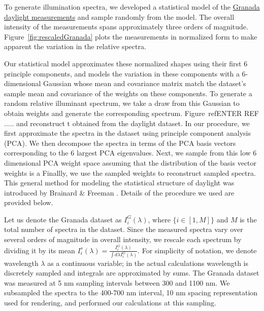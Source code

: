 \documentclass{jov}
\begin{document}
To generate illumination spectra, we developed a statistical model of the \href{http://colorimaginglab.ugr.es/pages/Data}{Granada daylight measurements} \cite{peyvandi2016colorimetric} and sample randomly from the model.
The overall intensity of the measurements spans approximately three orders of magnitude.
Figure~\ref{fig:rescaledGranada} plots the measurements in normalized form to make apparent the variation in the relative spectra.

Our statistical model approximates these normalized shapes using their first 6 principle components, and models the variation in these components with
a 6-dimensional Gaussian whose mean and covariance matrix match the dataset's sample mean and covariance of the weights on these components.
To generate a random relative illuminant spectrum, we take a draw from this Gaussian to obtain weights and generate the corresponding spectrum.
Figure~ref{ENTER REF} .....
and reconstruct t
obtained from the daylight dataset.
 In our procedure, we first approximate the spectra in the dataset using principle component analysis (PCA). We then decompose the spectra in terms of the PCA basis vectors corresponding to the 6 largest PCA eigenvalues. Next, we sample from this low 6 dimensional PCA weight space assuming that the distribution of the basis vector weights is a  Finallly, we use the sampled weights to reconstruct sampled spectra. This general method for modeling the statistical structure of daylight was introduced by Brainard \& Freeman \cite{BrainardFreeman}. Details of the procedure we used are provided below.

Let us denote the Granada dataset as $I^G_i(\lambda)$, where $\{i \in [1,M]\}$ and $M$ is the total number of spectra in the dataset. Since the measured spectra vary over several orders of magnitude in overall intensity, we rescale each spectrum by dividing it by its mean $I_i^s(\lambda) = \frac{I^G_i(\lambda)}{\int d\lambda I^G_i(\lambda)}$. For simplicity of notation, we denote wavelength $\lambda$ as a continuous variable; in the actual calculations wavelength is discretely sampled and integrals are approximated by sums.  The Granada dataset was measured at 5 nm sampling intervals between 300 and 1100 nm.  We subsampled the spectra to the 400-700 nm interval, 10 nm spacing representation used for rendering, and performed our calculations at this sampling.
\end{document}
